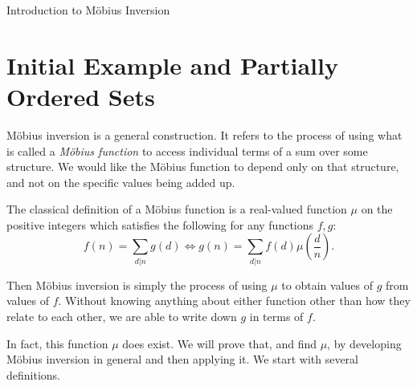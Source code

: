 \documentclass[12pt]{pom_thesis}
\begin{document}
\begin{chapter}{Introduction to M\"obius Inversion}
\section{Initial Example and Partially Ordered Sets}
M\"obius inversion is a general construction. It refers to the process of using what is called a \emph{M\"obius function} to access individual terms of a sum over some structure. We would like the M\"obius function to depend only on that structure, and not on the specific values being added up. 

The classical definition of a M\"obius function is a real-valued function $\mu$ on the positive integers which satisfies the following for any functions $f,g$:
\begin{equation}\label{init_mob} 
f(n) = \sum_{d | n} g(d) \iff g(n) = \sum_{d | n}  f(d)\mu\left(\frac dn\right).
\end{equation}

Then M\"obius inversion is simply the process of using $\mu$ to obtain values of $g$ from values of $f$. Without knowing anything about either function other than how they relate to each other, we are able to write down $g$ in terms of $f$. 

In fact, this function $\mu$ does exist. We will prove that, and find $\mu$, by developing M\"obius inversion in general and then applying it. We start with several definitions.


\end{chapter}
\end{document}

